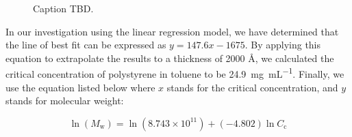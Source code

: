 \documentclass[twocolumn]{article}
\begin{document}
                \begin{figure}
                    \centering
                    \caption{Caption TBD.}\label{fig:ellips}
                \end{figure}

                In our investigation using the linear regression model, we have determined that the line of best fit can be expressed as $y = 147.6x - 1675$. By applying this equation to extrapolate the results to a thickness of 2000 \unit{\angstrom}, we calculated the critical concentration of polystyrene in toluene to be \qty{24.9}{\milli\gram\per\milli\liter}. Finally, we use the equation listed below where $x$ stands for the critical concentration, and $y$ stands for molecular weight:

                \begin{equation}
                    \ln{(M_\text{w})} = \ln{(8.743 \times 10^{11})} + (- 4.802) \ln{C_\text{c}}
                \end{equation}
\end{document}
